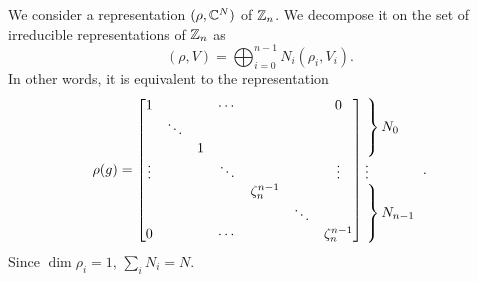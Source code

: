         We consider a representation $(\rho,\mathbb{C}^N)$ of $\mathbb{Z}_n$. We decompose it on the set of irreducible representations of $\mathbb{Z}_n$ as
        \begin{equation}
            (\rho,V)=\bigoplus^{n-1}_{i=0}N_i(\rho_i,V_i).
        \end{equation}
        In other words, it is equivalent to the representation
        \begin{equation}
            \rho(g)=
            \begin{bmatrix}
                1 & & & \cdots & & & 0 \\
                & \ddots & & & & & \\
                & & 1 & & & &  \\
                \vdots & & & \ddots & & & \vdots \\
                & & & & \zeta^{n-1}_n & & \\
                & & & & & \ddots & \\
                0 & & & \cdots & & & \zeta^{n-1}_n 
            \end{bmatrix}
            \hspace{-0.2cm}
            \begin{tabular}{l}
            $\left.\lefteqn{\phantom{
                \begin{matrix}
                    a_0\\ \ddots\\ a_0\ 
                \end{matrix} 
            }}\right\}N_0$\\
            \vdots \\
            $\left.\lefteqn{\phantom{
                \begin{matrix}
                    b_0\\ \ddots\\ b_0\ 
                \end{matrix}
            }} \right\}N_{n-1}$
            \end{tabular}.\label{eq:reprrhoZn}
        \end{equation}
        Since $\dim\rho_i=1$, $\sum_i N_i=N$. 


